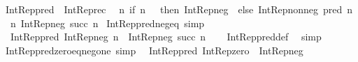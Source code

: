 \begin{isabellebody}
\isamarkupfalse%
%
\endisatagproof
{\isafoldproof}%
%
\isadelimproof
\isanewline
%
\endisadelimproof
\isanewline
{}\isamarkupfalse%
\ {\isachardoublequoteopen}Int{\isacharunderscore}{\kern0pt}Rep{\isacharunderscore}{\kern0pt}pred\ {\isasymequiv}\ Int{\isacharunderscore}{\kern0pt}Rep{\isacharunderscore}{\kern0pt}rec\isanewline
\ \ {\isacharparenleft}{\kern0pt}{\isasymlambda}n{\isachardot}{\kern0pt}\ if\ n\ {\isacharequal}{\kern0pt}\ {}\ then\ Int{\isacharunderscore}{\kern0pt}Rep{\isacharunderscore}{\kern0pt}neg\ {}\ else\ Int{\isacharunderscore}{\kern0pt}Rep{\isacharunderscore}{\kern0pt}nonneg\ {\isacharparenleft}{\kern0pt}pred\ n{\isacharparenright}{\kern0pt}{\isacharparenright}{\kern0pt}\isanewline
\ \ {\isacharparenleft}{\kern0pt}{\isasymlambda}n{\isachardot}{\kern0pt}\ Int{\isacharunderscore}{\kern0pt}Rep{\isacharunderscore}{\kern0pt}neg\ {\isacharparenleft}{\kern0pt}succ\ n{\isacharparenright}{\kern0pt}{\isacharparenright}{\kern0pt}{\isachardoublequoteclose}\isanewline
\isanewline
{}\isamarkupfalse%
\ Int{\isacharunderscore}{\kern0pt}Rep{\isacharunderscore}{\kern0pt}pred{\isacharunderscore}{\kern0pt}neg{\isacharunderscore}{\kern0pt}eq\ {\isacharbrackleft}{\kern0pt}simp{\isacharbrackright}{\kern0pt}{\isacharcolon}{\kern0pt}\isanewline
\ \ {\isachardoublequoteopen}Int{\isacharunderscore}{\kern0pt}Rep{\isacharunderscore}{\kern0pt}pred\ {\isacharparenleft}{\kern0pt}Int{\isacharunderscore}{\kern0pt}Rep{\isacharunderscore}{\kern0pt}neg\ n{\isacharparenright}{\kern0pt}\ {\isacharequal}{\kern0pt}\ Int{\isacharunderscore}{\kern0pt}Rep{\isacharunderscore}{\kern0pt}neg\ {\isacharparenleft}{\kern0pt}succ\ n{\isacharparenright}{\kern0pt}{\isachardoublequoteclose}\isanewline
%
\isadelimproof
\ \ %
\endisadelimproof
%
\isatagproof
{}\isamarkupfalse%
\ Int{\isacharunderscore}{\kern0pt}Rep{\isacharunderscore}{\kern0pt}pred{\isacharunderscore}{\kern0pt}def\ \isamarkupfalse%
\ simp%
\endisatagproof
{\isafoldproof}%
%
\isadelimproof
\isanewline
%
\endisadelimproof
\isanewline
{}\isamarkupfalse%
\ Int{\isacharunderscore}{\kern0pt}Rep{\isacharunderscore}{\kern0pt}pred{\isacharunderscore}{\kern0pt}zero{\isacharunderscore}{\kern0pt}eq{\isacharunderscore}{\kern0pt}neg{\isacharunderscore}{\kern0pt}one\ {\isacharbrackleft}{\kern0pt}simp{\isacharbrackright}{\kern0pt}{\isacharcolon}{\kern0pt}\isanewline
\ \ {\isachardoublequoteopen}Int{\isacharunderscore}{\kern0pt}Rep{\isacharunderscore}{\kern0pt}pred\ Int{\isacharunderscore}{\kern0pt}Rep{\isacharunderscore}{\kern0pt}zero\ {\isacharequal}{\kern0pt}\ Int{\isacharunderscore}{\kern0pt}Rep{\isacharunderscore}{\kern0pt}neg\ {}{\isachardoublequoteclose}\isanewline

\end{isabellebody}
